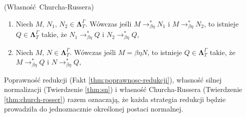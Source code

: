 

\begin{twierdzenie}\label{thm:church-rosser}(Własność Churcha-Russera)
  \begin{enumerate}[label=CR\arabic*.]
  \item Niech \(M,\,N_1,\,N_2\in\mathbf{\Lambda}^{\Gamma}_{T}\). Wówczas jeśli 
        \(M \longrightarrow^*_{\beta\eta} N_1\) i \(M \longrightarrow^{*}_{\beta\eta} N_2\),
        to istnieje \(Q\in\mathbf{\Lambda}^{\Gamma}_{T}\) takie, że
        \(N_1 \longrightarrow^*_{\beta\eta} Q\) i \(N_2 \longrightarrow^*_{\beta\eta} Q\),
  \item Niech \(M,\,N\in\mathbf{\Lambda}^{\Gamma}_{T}\). Wówczas jeśli 
        \(M ={\beta\eta} N\), to  istnieje \(Q\in\mathbf{\Lambda}^{\Gamma}_{T}\) takie, że
        \(M \longrightarrow^*_{\beta\eta} Q\) i \(N \longrightarrow^*_{\beta\eta} Q\),
  \end{enumerate}
  \begin{dowod}
  \cite[3.6.3]{Urzyczyn2006}
  \end{dowod}
\end{twierdzenie}

Poprawność redukcji (Fakt \ref{thm:poprawnosc-redukcji}), własność silnej normalizacji (Twierdzenie \ref{thm:sn}) i własność Churcha-Russera (Twierdzenie \ref{thm:church-rosser}) razem oznaczają, że każda strategia redukcji będzie prowadziła do jednoznacznie określonej postaci normalnej.
